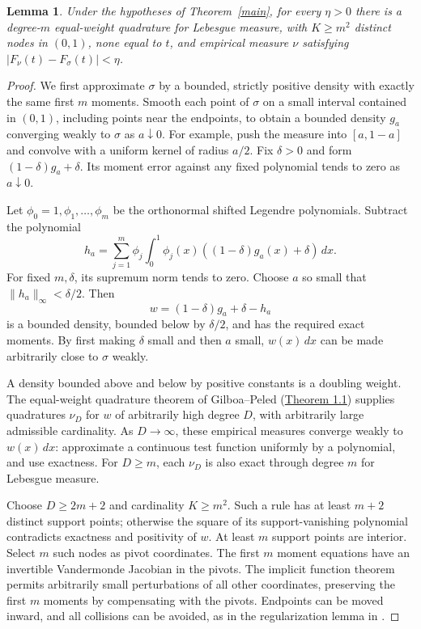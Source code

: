 \documentclass[11pt]{article}
\newtheorem{lemma}{Lemma}
\begin{document}
\begin{lemma}\label{approx}
Under the hypotheses of Theorem~\ref{main}, for every $\eta>0$ there
is a degree-$m$ equal-weight quadrature for Lebesgue measure, with
$K\ge m^2$ distinct nodes in $(0,1)$, none equal to $t$, and empirical
measure $\nu$ satisfying $|F_\nu(t)-F_\sigma(t)|<\eta$.
\end{lemma}
\begin{proof}
We first approximate $\sigma$ by a bounded, strictly positive density
with exactly the same first $m$ moments. Smooth each point of $\sigma$
on a small interval contained in $(0,1)$, including points near the
endpoints, to obtain a bounded density $g_a$ converging weakly to
$\sigma$ as $a\downarrow0$. For example, push the measure into
$[a,1-a]$ and convolve with a uniform kernel of radius $a/2$.
Fix $\delta>0$ and form $(1-\delta)g_a+\delta$.
Its moment error against any fixed polynomial tends to zero as
$a\downarrow0$.

Let $\phi_0=1,\phi_1,\ldots,\phi_m$ be the orthonormal shifted
Legendre polynomials. Subtract the polynomial
\[
 h_a=\sum_{j=1}^m\phi_j
       \int_0^1\phi_j(x)((1-\delta)g_a(x)+\delta)\,dx.
\]
For fixed $m,\delta$, its supremum norm tends to zero. Choose $a$
so small that $\|h_a\|_\infty<\delta/2$. Then
\[
 w=(1-\delta)g_a+\delta-h_a
\]
is a bounded density, bounded below by $\delta/2$, and has the
required exact moments. By first making $\delta$ small and then $a$
small, $w(x)\,dx$ can be made arbitrarily close to $\sigma$ weakly.

A density bounded above and below by positive constants is a doubling
weight. The equal-weight quadrature theorem of Gilboa--Peled
(\href{https://arxiv.org/abs/1507.01505}{Theorem 1.1}) supplies
quadratures $\nu_D$ for $w$ of arbitrarily high degree $D$, with
arbitrarily large admissible cardinality. As $D\to\infty$, these
empirical measures converge weakly to $w(x)\,dx$: approximate a
continuous test function uniformly by a polynomial, and use
exactness. For $D\ge m$, each $\nu_D$ is also exact through degree
$m$ for Lebesgue measure.

Choose $D\ge2m+2$ and cardinality $K\ge m^2$. Such a rule has at
least $m+2$ distinct support points; otherwise the square of its
support-vanishing polynomial contradicts exactness and positivity
of $w$. At least $m$ support points are interior. Select $m$ such
nodes as pivot coordinates. The first $m$ moment equations have
an invertible Vandermonde Jacobian in the pivots. The implicit
function theorem permits arbitrarily small perturbations of all
other coordinates, preserving the first $m$ moments by compensating
with the pivots. Endpoints can be moved inward, and all collisions
can be avoided, as in the regularization lemma in
.


\end{proof}
\end{document}
